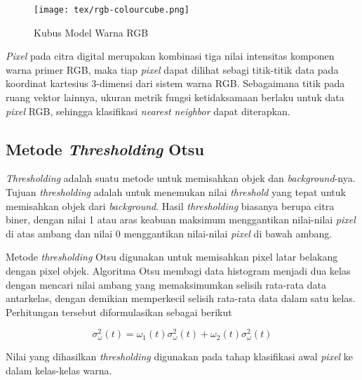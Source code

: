\documentclass[laporan.tex]{subfiles}
\begin{document}
\begin{figure}[h!]
\centering
\texttt{[image: tex/rgb-colourcube.png]}
\caption{Kubus Model Warna RGB}
\end{figure}

\emph{Pixel} pada citra digital merupakan kombinasi tiga nilai intensitas komponen warna primer RGB, maka tiap \emph{pixel} dapat dilihat sebagi titik-titik data pada koordinat kartesius 3-dimensi dari sistem warna RGB. Sebagaimana titik pada ruang vektor lainnya, ukuran metrik fungsi ketidaksamaan berlaku untuk data \emph{pixel} RGB, sehingga klasifikasi \emph{nearest neighbor} dapat diterapkan.


\subsection{Metode \emph{Thresholding} Otsu}

\emph{Thresholding} adalah suatu metode untuk memisahkan objek dan \emph{background}-nya. Tujuan \emph{thresholding} adalah untuk menemukan nilai \emph{threshold} yang tepat untuk memisahkan objek dari \emph{background}. Hasil \emph{thresholding} biasanya berupa citra biner, dengan nilai 1 atau aras keabuan maksimum menggantikan nilai-nilai \emph{pixel} di atas ambang dan nilai 0 menggantikan nilai-nilai \emph{pixel} di bawah ambang.

Metode \emph{thresholding} Otsu digunakan untuk memisahkan pixel latar belakang dengan pixel objek. Algoritma Otsu membagi data histogram menjadi dua kelas dengan mencari nilai ambang yang memaksimumkan selisih rata-rata data antarkelas, dengan demikian memperkecil selisih rata-rata data dalam satu kelas. Perhitungan tersebut diformulasikan sebagai berikut

\begin{equation}
	\sigma_{\omega}^2 (t) = \omega_1 (t) \sigma_{\omega}^2 (t) + \omega_2 (t) \sigma_{\omega}^2 (t)
\end{equation}

Nilai yang dihasilkan \emph{thresholding} digunakan pada tahap klasifikasi awal \emph{pixel} ke dalam kelas-kelas warna.
\end{document}

